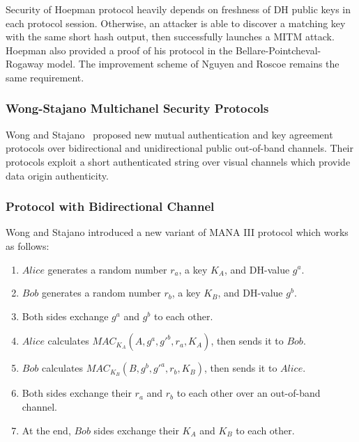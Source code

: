 Security of Hoepman protocol heavily depends on freshness of DH public keys in each protocol session. Otherwise, an attacker is able to discover a matching key with the same short hash output, then successfully launches a MITM attack. Hoepman also provided a proof of his protocol in the Bellare-Pointcheval- Rogaway model. The improvement scheme of Nguyen and Roscoe remains the same requirement. 

\subsubsection{Wong-Stajano Multichanel Security Protocols}\label{WS}

Wong and Stajano~\cite{10.1109/MPRV.2007.76} proposed new mutual authentication and key agreement protocols over bidirectional and unidirectional public out-of-band channels. Their protocols exploit a short authenticated string over visual channels which provide data origin authenticity. 

\subsubsection*{Protocol with Bidirectional Channel}

Wong and Stajano introduced a new variant of MANA III protocol which works as follows:

\begin{enumerate}
\item $Alice$ generates a random number $r_a$, a key $K_A$, and DH-value $g^a$.
\item $Bob$ generates a random number $r_b$, a key $K_B$, and DH-value $g^b$.
\item Both sides exchange $g^a$ and $g^b$ to each other.
\item $Alice$ calculates $MAC_{K_A}(A,g^a,g'^b,r_a,K_A)$, then sends it to $Bob$. 
\item $Bob$ calculates $MAC_{K_B}(B,g^b,g'^a,r_b,K_B)$, then sends it to $Alice$.
\item Both sides exchange their $r_a$ and $r_b$ to each other over an out-of-band channel. 
\item At the end, $Bob$ sides exchange their $K_A$ and $K_B$ to each other. 
\end{enumerate}

